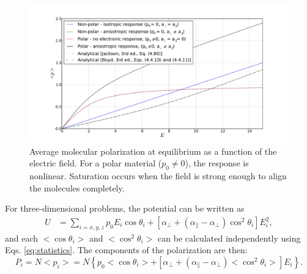 \documentclass[12pt,letterpaper]{article}
\begin{document}
\begin{figure}[ht]
    \includegraphics[width=17.2cm]{static_polarization.pdf}
    \caption{Average molecular polarization at equilibrium as a function of the electric field. For a polar material ($p_0\neq 0$), the response is nonlinear. Saturation occurs when the field is strong enough to align the molecules completely.}
    \label{fig:stat_pol}
\end{figure} 

For three-dimensional problems, the potential can be written as 
\begin{align}\label{eq:potential_altern}
U &= \sum_{i=x,y,z} p_0E_i\cos\theta_i+\left[\alpha_\bot + (\alpha_\parallel - \alpha_\bot)\cos^2\theta_i\right]E_i^2,
\end{align}
and each $<\cos\theta_i>$ and $<\cos^2\theta_i>$ can be calculated independently using Eqs. \eqref{eq:statistics}. The components of the polarization are then:
\begin{equation}\label{eq:pol_components}
 P_i=N<p_i>=N\left\lbrace p_0<\cos\theta_i>+\left[\alpha_\bot + (\alpha_\parallel - \alpha_\bot)<\cos^2\theta_i>\right]E_i\right\rbrace.
\end{equation}
\end{document}
